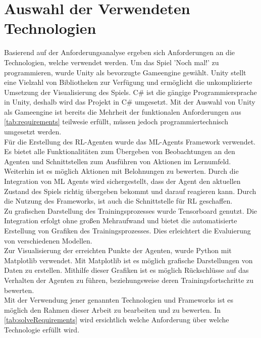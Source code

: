 \section{Auswahl der Verwendeten Technologien}
Basierend auf der Anforderungsanalyse ergeben sich Anforderungen an die Technologien, welche verwendet werden. 
Um das Spiel 'Noch mal!' zu programmieren, wurde Unity als bevorzugte Gameengine gewählt. Unity stellt eine Vielzahl von Bibliotheken zur Verfügung und ermöglicht die unkomplizierte Umsetzung der Visualisierung des Spiels. C\# ist die gängige Programmiersprache in Unity, deshalb wird das Projekt in C\# umgesetzt. Mit der Auswahl von Unity als Gameengine ist bereits die Mehrheit der funktionalen Anforderungen aus \ref{tab:requirements} teilwesie erfüllt, müssen jedoch programmiertechnisch umgesetzt werden. \\
Für die Erstellung des RL-Agenten wurde das ML-Agents Framework verwendet. Es bietet alle Funktionalitäten zum Übergeben von Beobachtungen an den Agenten und Schnittstellen zum Ausführen von Aktionen im Lernumfeld. Weiterhin ist es möglich Aktionen mit Belohnungen zu bewerten. Durch die Integration von ML Agents wird sichergestellt, dass der Agent den aktuellen Zustand des Spiels richtig übergeben bekommt und darauf reagieren kann. Durch die Nutzung des Frameworks, ist auch die Schnittstelle für RL geschaffen.\\
Zu grafischen Darstellung des Trainingsprozesses wurde Tensorboard genutzt. Die Integration erfolgt ohne großen Mehraufwand und bietet die automatisierte Erstellung von Grafiken des Trainingsprozesses. Dies erleichtert die Evaluierung von verschiedenen Modellen. \\ 
Zur Visualisierung der erreichten Punkte der Agenten, wurde Python mit Matplotlib verwendet. Mit Matplotlib ist es möglich grafische Darstellungen von Daten zu erstellen. Mithilfe dieser Grafiken ist es möglich Rückschlüsse auf das Verhalten der Agenten zu führen, beziehungsweise deren Trainingsfortschritte zu bewerten. \\
Mit der Verwendung jener genannten Technologien und Frameworks ist es möglich den Rahmen dieser Arbeit zu bearbeiten und zu bewerten.
In \ref{tab:solveRequirements} wird ersichtlich welche Anforderung über welche Technologie erfüllt wird. \\



